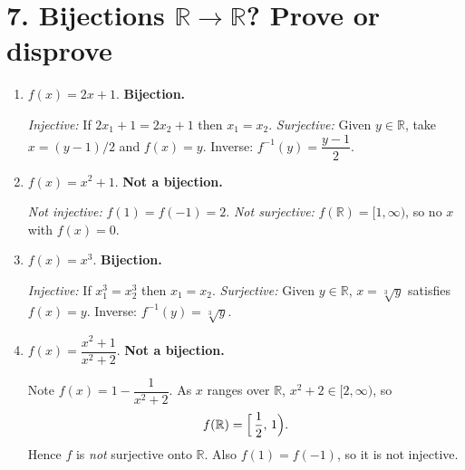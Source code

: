 \section*{7. Bijections $\mathbb{R}\to\mathbb{R}$? Prove or disprove}

\begin{enumerate}[label=(\alph*),leftmargin=*]
\item $f(x)=2x+1$. \textbf{Bijection.}

\emph{Injective:} If $2x_1+1=2x_2+1$ then $x_1=x_2$. \quad
\emph{Surjective:} Given $y\in\mathbb{R}$, take $x=(y-1)/2$ and $f(x)=y$.
Inverse: $f^{-1}(y)=\dfrac{y-1}{2}$.

\item $f(x)=x^2+1$. \textbf{Not a bijection.}

\emph{Not injective:} $f(1)=f(-1)=2$. \quad
\emph{Not surjective:} $f(\mathbb{R})=[1,\infty)$, so no $x$ with $f(x)=0$.

\item $f(x)=x^3$. \textbf{Bijection.}

\emph{Injective:} If $x_1^3=x_2^3$ then $x_1=x_2$. \quad
\emph{Surjective:} Given $y\in\mathbb{R}$, $x=\sqrt[3]{y}$ satisfies $f(x)=y$.
Inverse: $f^{-1}(y)=\sqrt[3]{y}$.

\item $f(x)=\dfrac{x^2+1}{x^2+2}$. \textbf{Not a bijection.}

Note $f(x)=1-\dfrac{1}{x^2+2}$. As $x$ ranges over $\mathbb{R}$, $x^2+2\in[2,\infty)$, so
\[
f(\mathbb{R})=\Bigl[\,\frac12,\,1\Bigr).
\]
Hence $f$ is \emph{not} surjective onto $\mathbb{R}$. Also $f(1)=f(-1)$, so it is not injective.
\end{enumerate}
